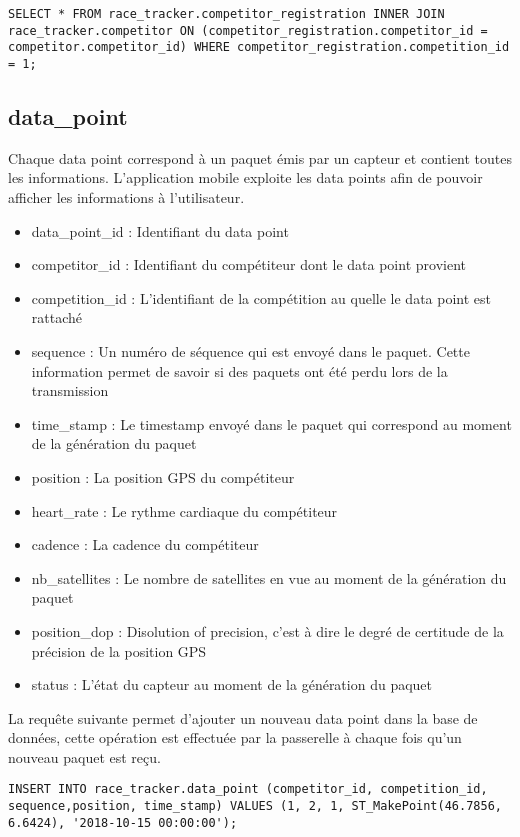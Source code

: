 \begin{lstlisting}[style=SQLStyle]
SELECT * FROM race_tracker.competitor_registration INNER JOIN race_tracker.competitor ON (competitor_registration.competitor_id = competitor.competitor_id) WHERE competitor_registration.competition_id = 1;
\end{lstlisting}

\subsection{data\_point}

Chaque data point correspond à un paquet émis par un capteur et contient toutes les informations. L'application mobile exploite les data points afin de pouvoir afficher les informations à l'utilisateur.

\begin{itemize}
\item data\_point\_id : Identifiant du data point
\item competitor\_id : Identifiant du compétiteur dont le data point provient
\item competition\_id : L'identifiant de la compétition au quelle le data point est rattaché
\item sequence : Un numéro de séquence qui est envoyé dans le paquet. Cette information permet de savoir si des paquets ont été perdu lors de la transmission
\item time\_stamp : Le timestamp envoyé dans le paquet qui correspond au moment de la génération du paquet
\item position : La position GPS du compétiteur
\item heart\_rate : Le rythme cardiaque du compétiteur
\item cadence : La cadence du compétiteur
\item nb\_satellites : Le nombre de satellites en vue au moment de la génération du paquet
\item position\_dop : Disolution of precision, c'est à dire le degré de certitude de la précision de la position GPS
\item status : L'état du capteur au moment de la génération du paquet
\end{itemize}

La requête suivante permet d'ajouter un nouveau data point dans la base de données, cette opération est effectuée par la passerelle à chaque fois qu'un nouveau paquet est reçu.

\begin{lstlisting}[style=SQLStyle]
INSERT INTO race_tracker.data_point (competitor_id, competition_id, sequence,position, time_stamp) VALUES (1, 2, 1, ST_MakePoint(46.7856, 6.6424), '2018-10-15 00:00:00');
\end{lstlisting}

